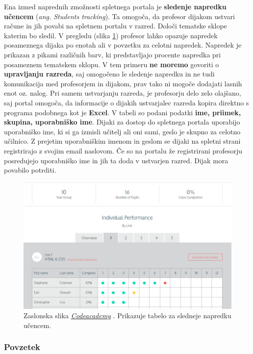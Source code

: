 Ena izmed naprednih zmožnosti spletnega portala je \textbf{sledenje
  napredku učencem} (\emph{ang. Students tracking}). Ta omogoča, da
profesor dijakom ustvari račune in jih povabi na spletnem portalu v
razred. Določi tematske sklope katerim bo sledil. V pregledu (slika
\ref{fig:scr:web:codeacademy:tracking}) profesor lahko opazuje
napredek posameznega dijaka po enotah ali v povzetku za celotni
napredek. Napredek je prikazan z pikami različnih barv, ki
predstavljajo procente napredka pri posameznem tematskem sklopu. V tem
primeru \textbf{ne moremo} govoriti o \textbf{upravljanju razreda},
saj omogočeno le sledenje napredku in ne tudi komunikacija med
profesorjem in dijakom, prav tako ni mogoče dodajati lasnih enot
oz. nalog. Pri samem ustvarjanju razreda, je profesorju delo zelo
olajšano, saj portal omogoča, da informacije o dijakih ustvarjalec
razreda kopira direktno s programa podobnega kot je \textbf{Excel}. V
tabeli so podani podatki \textbf{ime, priimek, skupina, uporabniško
  ime}. Dijaki za dostop do spletnega portala uporabijo uporabniško
ime, ki si ga izmisli učitelj ali oni sami, geslo je skupno za celotno
učilnico. Z prejetim uporabniškim imenom in geslom se dijaki na
spletni strani registrirajo z svojim email naslovom. Če so na portalu
že registrirani profesorju posredujejo uporabniško ime in jih ta doda
v ustvarjen razred. Dijak mora povabilo potrditi.

\begin{figure}[h!]
  \centering
    \includegraphics [width=0.65\linewidth, keepaspectratio =
   1] {./images/sc_web/codeacademy_tracking_01.jpg}
   \caption{Zaslonska slika
     \emph{\href{https://www.codecademy.com/}{Codeacademy}}
     \cite{web:codeacademy}. Prikazuje tabelo za sledneje napredku
     učencem.}
    \label{fig:scr:web:codeacademy:tracking}
\end{figure}

\subsubsection{Povzetek}

